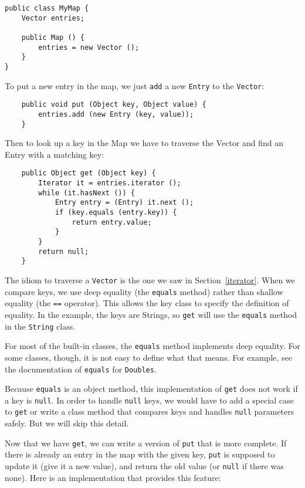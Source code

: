 \begin{verbatim}
public class MyMap {
    Vector entries;

    public Map () {
        entries = new Vector ();
    }
}
\end{verbatim}

To put a new entry in the map, we just {\tt add} a new
{\tt Entry} to the {\tt Vector}:

\begin{verbatim}
    public void put (Object key, Object value) {
        entries.add (new Entry (key, value));
    }
\end{verbatim}

Then to look up a key in the Map we have to traverse the
Vector and find an Entry with a matching
key:

\begin{verbatim}
    public Object get (Object key) {
        Iterator it = entries.iterator ();
        while (it.hasNext ()) {
            Entry entry = (Entry) it.next ();
            if (key.equals (entry.key)) {
                return entry.value;
            }
        }
        return null;
    }
\end{verbatim}
%
The idiom to traverse a {\tt Vector} is the one we saw in
Section~\ref{iterator}.  When we compare keys, we use deep
equality (the {\tt equals} method) rather than shallow
equality (the {\tt ==} operator).  This allows the key class
to specify the definition of equality.  In the example, the
keys are Strings, so {\tt get} will use the {\tt equals}
method in the {\tt String} class.


For most of the built-in classes, the {\tt equals} method
implements deep equality.  For some classes, though, it is
not easy to define what that means.  For example, see the
documentation of {\tt equals} for {\tt Doubles}.


Because {\tt equals} is an object method, this implementation
of {\tt get} does not work if a key is {\tt null}.  In order to
handle {\tt null} keys, we would have to add a special case to
{\tt get} or write a class method that compares keys and handles
{\tt null} parameters safely.  But we will skip this detail.

Now that we have {\tt get}, we can write a version of {\tt put} that
is more complete.  If there is already an entry in the map with the
given key, {\tt put} is supposed to update it (give it a new value),
and return the old value (or {\tt null} if there was none).  Here is
an implementation that provides this feature:

